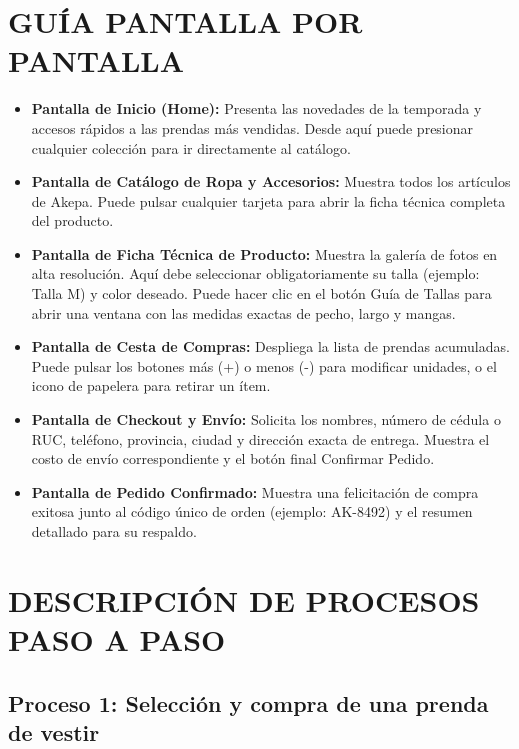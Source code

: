 \documentclass[12pt]{article}
\begin{document}
\section*{GUÍA PANTALLA POR PANTALLA}
\begin{itemize}
    \item \textbf{Pantalla de Inicio (Home):} Presenta las novedades de la temporada y accesos rápidos a las prendas más vendidas. Desde aquí puede presionar cualquier colección para ir directamente al catálogo.
    \item \textbf{Pantalla de Catálogo de Ropa y Accesorios:} Muestra todos los artículos de Akepa. Puede pulsar cualquier tarjeta para abrir la ficha técnica completa del producto.
    \item \textbf{Pantalla de Ficha Técnica de Producto:} Muestra la galería de fotos en alta resolución. Aquí debe seleccionar obligatoriamente su talla (ejemplo: Talla M) y color deseado. Puede hacer clic en el botón Guía de Tallas para abrir una ventana con las medidas exactas de pecho, largo y mangas.
    \item \textbf{Pantalla de Cesta de Compras:} Despliega la lista de prendas acumuladas. Puede pulsar los botones más (+) o menos (-) para modificar unidades, o el icono de papelera para retirar un ítem.
    \item \textbf{Pantalla de Checkout y Envío:} Solicita los nombres, número de cédula o RUC, teléfono, provincia, ciudad y dirección exacta de entrega. Muestra el costo de envío correspondiente y el botón final Confirmar Pedido.
    \item \textbf{Pantalla de Pedido Confirmado:} Muestra una felicitación de compra exitosa junto al código único de orden (ejemplo: AK-8492) y el resumen detallado para su respaldo.
\end{itemize}

\section*{DESCRIPCIÓN DE PROCESOS PASO A PASO}

\subsection*{Proceso 1: Selección y compra de una prenda de vestir}
\end{document}
